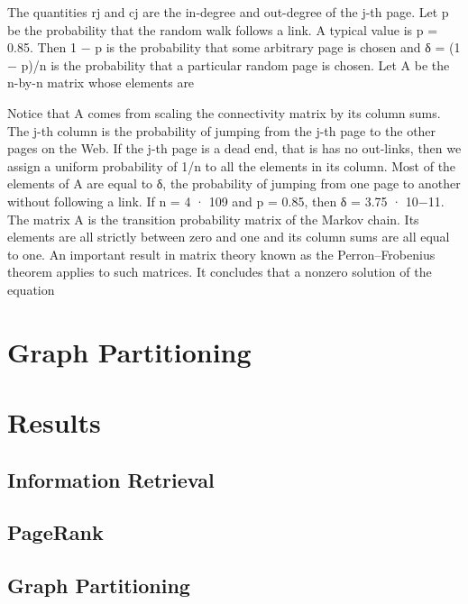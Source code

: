 \documentclass[12 pt]{article}
\begin{document}
The quantities rj and cj are the in-degree and out-degree of the j-th page. Let p be the probability that the random walk follows a link. A typical value is p = 0.85. Then 1 − p is the probability that some arbitrary page is chosen and δ = (1 − p)/n is the probability that a particular random page is chosen. Let A be the n-by-n matrix whose elements are

Notice that A comes from scaling the connectivity matrix by its column sums. The j-th column is the probability of jumping from the j-th page to the other pages on the Web. If the j-th page is a dead end, that is has no out-links, then we assign a uniform probability of 1/n to all the elements in its column. Most of the elements of A are equal to δ, the probability of jumping from one page to another without following a link. If n = 4 · 109 and p = 0.85, then δ = 3.75 · 10−11. The matrix A is the transition probability matrix of the Markov chain. Its elements are all strictly between zero and one and its column sums are all equal to one. An important result in matrix theory known as the Perron–Frobenius theorem applies to such matrices. It concludes that a nonzero solution of the equation
\section{Graph Partitioning}

\section{Results}
\subsection{Information Retrieval}
\subsection{PageRank}
\subsection{Graph Partitioning}
\end{document}
